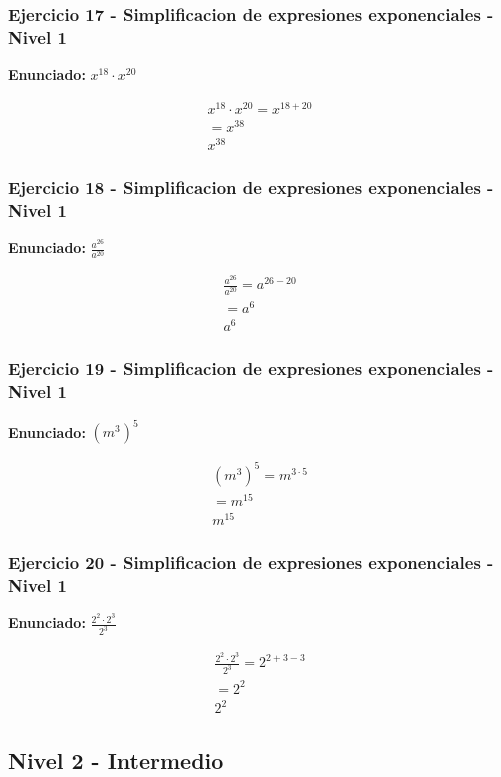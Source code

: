 \documentclass[12pt,a4paper]{article}
\begin{document}
\subsubsection*{Ejercicio 17 - Simplificacion de expresiones exponenciales - Nivel 1}
\textbf{Enunciado:} \(x^{18}\cdot x^{20}\)

\[
\begin{aligned}
x^{18}\cdot x^{20}=x^{18+20}\\
=x^{38}\\
\boxed{x^{38}}
\end{aligned}
\]


\subsubsection*{Ejercicio 18 - Simplificacion de expresiones exponenciales - Nivel 1}
\textbf{Enunciado:} \(\frac{a^{26}}{a^{20}}\)

\[
\begin{aligned}
\frac{a^{26}}{a^{20}}=a^{26-20}\\
=a^{6}\\
\boxed{a^{6}}
\end{aligned}
\]


\subsubsection*{Ejercicio 19 - Simplificacion de expresiones exponenciales - Nivel 1}
\textbf{Enunciado:} \(\left(m^{3}\right)^{5}\)

\[
\begin{aligned}
\left(m^{3}\right)^{5}=m^{3\cdot 5}\\
=m^{15}\\
\boxed{m^{15}}
\end{aligned}
\]


\subsubsection*{Ejercicio 20 - Simplificacion de expresiones exponenciales - Nivel 1}
\textbf{Enunciado:} \(\frac{2^{2}\cdot 2^{3}}{2^{3}}\)

\[
\begin{aligned}
\frac{2^{2}\cdot 2^{3}}{2^{3}}=2^{2+3-3}\\
=2^{2}\\
\boxed{2^{2}}
\end{aligned}
\]


\newpage

\subsection*{Nivel 2 - Intermedio}
\end{document}
